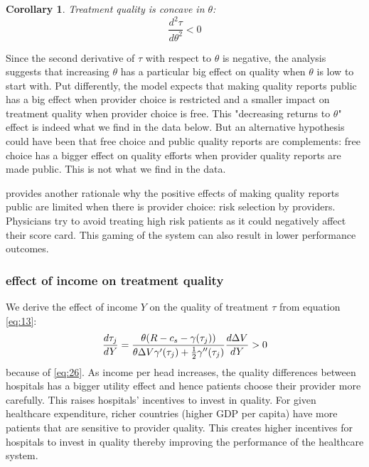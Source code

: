 \documentclass[12pt,english,a4paper]{article}
\newtheorem{corollary}{Corollary}
\begin{document}
\begin{corollary}
\label{cor:tautheta}
Treatment quality is concave in \(\theta\):
\begin{equation}
\label{eq:21}
\frac{d^2\tau}{d\theta^2} < 0
\end{equation}
\end{corollary}

Since the second derivative of \(\tau\) with respect to \(\theta\) is negative, the analysis suggests that increasing \(\theta\) has a particular big effect on quality when \(\theta\) is low to start with. Put differently, the model expects that making quality reports public has a big effect when provider choice is restricted and a smaller impact on treatment quality when provider choice is free. This "decreasing returns to \(\theta\)" effect is indeed what we find in the data below. But an alternative hypothesis could have been that free choice and public quality reports are complements: free choice has a bigger effect on quality efforts when provider quality reports are made public. This is not what we find in the data.

\cite{dranoveReportCards2003} provides another rationale why the positive effects of making quality reports public are limited when there is provider choice: risk selection by providers. Physicians try to avoid treating high risk patients as it could negatively affect their score card. This gaming of the system can also result in lower performance outcomes.

\subsubsection{effect of income on treatment quality}
\label{sec:orgaeb1735}

We derive the effect of income \(Y\) on the quality of treatment \(\tau\) from equation \eqref{eq:13}: 
\begin{equation}
\label{eq:29}
\frac{d\tau_j}{dY} = \frac{\theta (R-c_s-\gamma(\tau_j))}{\theta \Delta V \gamma'(\tau_j) + \textstyle{1\over 2} \gamma''(\tau_j) } \frac{d\Delta V}{dY} > 0
\end{equation}
because of \eqref{eq:26}. As income per head increases, the quality differences between hospitals has a bigger utility effect and hence patients choose their provider more carefully. This raises hospitals' incentives to invest in quality. For given healthcare expenditure, richer countries (higher GDP per capita) have more patients that are sensitive to provider quality. This creates higher incentives for hospitals to invest in quality thereby improving the performance of the healthcare system.
\end{document}
